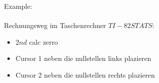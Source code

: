 Example:\\
\fboxrule=0.8pt \\

Rechnungsweg im Taschenrechner $TI-82STATS$:\\
\begin{itemize}
    \item $2nd$ calc zerro
    \item Cursor 1 neben die nullstellen links plazieren 
    \item Cursor 2 neben die nullstellen rechts plazieren
\end{itemize}
